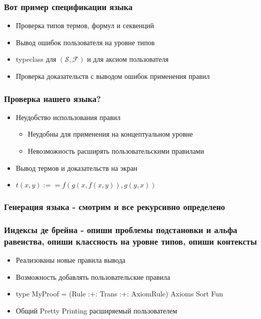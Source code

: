 \documentclass[14pt]{beamer}
\begin{document}
\begin{frame}
\frametitle{Вот пример спецификации языка}
\begin{itemize} %
  \item Проверка типов термов, формул и секвенций
  \item Вывод ошибок пользователя на уровне типов
  \item typeclass для $(\mathcal{S},\mathcal{F})$ и для аксиом пользователя
  \item Проверка доказательств с выводом ошибок применения правил
\end{itemize}
\end{frame}

\begin{frame}
\frametitle{Проверка нашего языка?}
\begin{itemize} %
  \item Неудобство использования правил
  \begin{itemize}
    \item Неудобны для применения на концептуальном уровне
    \item Невозможность расширять пользовательскими правилами
  \end{itemize}
  \item Вывод термов и доказательств на экран
  \item $t(x, y) :== f(g(x,f(x,y)), g(y,x))$
\end{itemize}
\end{frame}

\begin{frame}
\frametitle{Генерация языка - смотрим и все рекурсивно определено}
\end{frame}


\begin{frame}
\frametitle{Индексы де брейна - опиши проблемы подстановки и альфа равенства, опиши классность на уровне типов, опиши контексты}
\begin{itemize} %
  \item Реализованы новые правила вывода
  \item Возможность добавлять пользовательские правила
  \item type MyProof = (Rule :+: Trans :+: AxiomRule) Axioms Sort Fun
  \item Общий Pretty Printing расширяемый пользователем
\end{itemize}
\end{frame}
\end{document}
